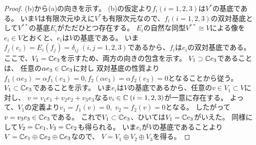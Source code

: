 \documentclass[report]{jlreq}
\begin{document}
\begin{proof}
    (b)から(a)の向きを示す。
    (b)の仮定より$f_i (i = 1, 2, 3)$は$V^*$の基底である。
    いま$V$は有限次元ゆえに$V^*$も有限次元なので、$f_i (i = 1, 2, 3)$の双対基底として$V^{**}$の基底$E_i$がただひとつ存在する。
    $E_i$の自然な同型$V^{**} \cong V$による像を$e_i \in V$とおくと、$e_i$は$V$の基底である。
    いま$f_j(e_i) = E_i(f_j) = \delta_{ij} \; (i, j = 1, 2, 3)$であるから、$f_i$は$e_i$の双対基底である。
    ここで、$V_1 = \mathbb{C} e_3$を示すため、両方の向きの包含を示す。
    $V_1 \supset \mathbb{C} e_3$であることは、
    任意の$\alpha e_3 \in \mathbb{C} e_3$に対し
    双対基底の性質より$f_1(\alpha e_3) = \alpha f_1(e_3) = 0, f_2(\alpha e_3) = \alpha f_2(e_3) = 0$となることから従う。
    $V_1 \subset \mathbb{C} e_3$であることを示す。
    いま$e_i$は$V$の基底であるから、任意の$v \in V_1 \subset V$に対し、
    $v = v_1 e_1 + v_2 e_2 + v_3 e_3$なる$v_i \in \mathbb{C} \; (i = 1, 2, 3)$が一意に存在する。
    よって、$V_1$の定義より$v_1 = f_1(v) = 0, \; v_2 = f_2(v) = 0$となる。
    したがって$v = v_3 e_3 \in \mathbb{C} e_3$である。
    これで$V_1 \subset \mathbb{C} e_3$、ひいては$V_1 = \mathbb{C} e_3$がいえた。
    同様にして$V_2 = \mathbb{C} e_1, V_3 = \mathbb{C} e_2$も得られる。
    いま$e_i$が$V$の基底であることより$V = \mathbb{C} e_1 \oplus \mathbb{C} e_2 \oplus \mathbb{C} e_3$なので、
    $V = V_1 \oplus V_2 \oplus V_3$を得る。


\end{proof}
\end{document}
